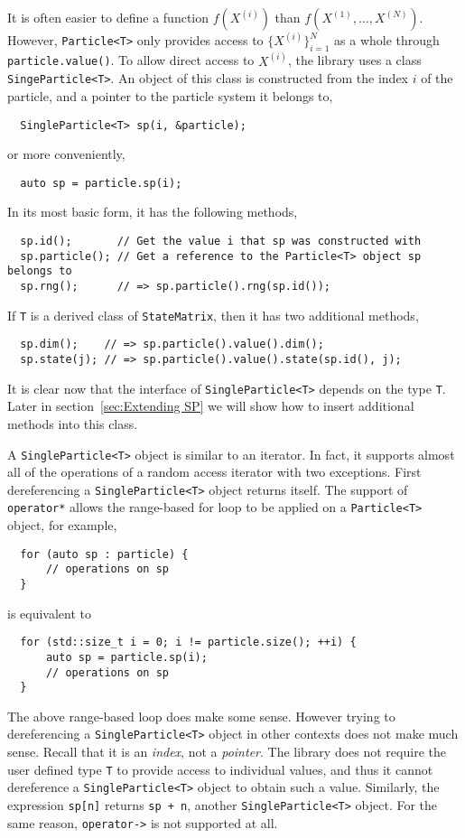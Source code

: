 It is often easier to define a function $f(X^{(i)})$ than
$f(X^{(1)},\dots,X^{(N)})$. However, \verb|Particle<T>| only provides access to
$\{X^{(i)}\}_{i=1}^N$ as a whole through \verb|particle.value()|. To allow
direct access to $X^{(i)}$, the library uses a class \verb|SingeParticle<T>|.
An object of this class is constructed from the index $i$ of the particle, and
a pointer to the particle system it belongs to,
\begin{Verbatim}
  SingleParticle<T> sp(i, &particle);
\end{Verbatim}
or more conveniently,
\begin{Verbatim}
  auto sp = particle.sp(i);
\end{Verbatim}
In its most basic form, it has the following methods,
\begin{Verbatim}
  sp.id();       // Get the value i that sp was constructed with
  sp.particle(); // Get a reference to the Particle<T> object sp belongs to
  sp.rng();      // => sp.particle().rng(sp.id());
\end{Verbatim}
If \verb|T| is a derived class of \verb|StateMatrix|, then it has two
additional methods,
\begin{Verbatim}
  sp.dim();    // => sp.particle().value().dim();
  sp.state(j); // => sp.particle().value().state(sp.id(), j);
\end{Verbatim}
It is clear now that the interface of \verb|SingleParticle<T>| depends on the
type \verb|T|. Later in section~\ref{sec:Extending SP} we will show how to
insert additional methods into this class.

A \verb|SingleParticle<T>| object is similar to an iterator. In fact, it
supports almost all of the operations of a random access iterator with two
exceptions. First dereferencing a \verb|SingleParticle<T>| object returns
itself. The support of \verb|operator*| allows the range-based for loop to be
applied on a \verb|Particle<T>| object, for example,
\begin{Verbatim}
  for (auto sp : particle) {
      // operations on sp
  }
\end{Verbatim}
is equivalent to
\begin{Verbatim}
  for (std::size_t i = 0; i != particle.size(); ++i) {
      auto sp = particle.sp(i);
      // operations on sp
  }
\end{Verbatim}
The above range-based loop does make some sense. However trying to
dereferencing a \verb|SingleParticle<T>| object in other contexts does not make
much sense. Recall that it is an \emph{index}, not a \emph{pointer}. The
library does not require the user defined type \verb|T| to provide access to
individual values, and thus it cannot dereference a \verb|SingleParticle<T>|
object to obtain such a value. Similarly, the expression \verb|sp[n]| returns
\verb|sp + n|, another \verb|SingleParticle<T>| object. For the same reason,
\verb|operator->| is not supported at all.

